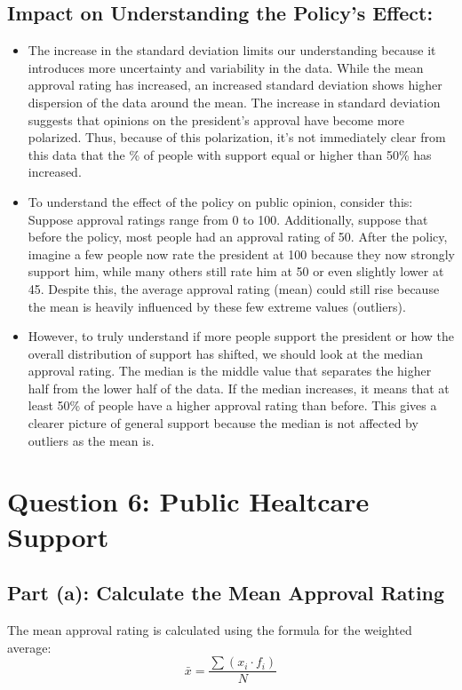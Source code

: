 \documentclass{article}
\begin{document}
\subsection*{Impact on Understanding the Policy's Effect:}
    \begin{itemize}
        \item The increase in the standard deviation limits our understanding because it introduces more uncertainty and variability in the data. While the mean approval rating has increased, an increased standard deviation shows higher dispersion of the data around the mean. The increase in standard deviation suggests that opinions on the president's approval have become more polarized. Thus, because of this polarization, it's not immediately clear from this data that the \% of people with support equal or higher than 50\% has increased.
        \item To understand the effect of the policy on public opinion, consider this: Suppose approval ratings range from 0 to 100. Additionally, suppose that before the policy, most people had an approval rating of 50. After the policy, imagine a few people now rate the president at 100 because they now strongly support him, while many others still rate him at 50 or even slightly lower at 45. Despite this, the average approval rating (mean) could still rise because the mean is heavily influenced by these few extreme values (outliers).
        \item However, to truly understand if more people support the president or how the overall distribution of support has shifted, we should look at the median approval rating. The median is the middle value that separates the higher half from the lower half of the data. If the median increases, it means that at least 50\% of people have a higher approval rating than before. This gives a clearer picture of general support because the median is not affected by outliers as the mean is.
    \end{itemize}

\section{Question 6: Public Healtcare Support}

\subsection*{Part (a): Calculate the Mean Approval Rating}
The mean approval rating is calculated using the formula for the weighted average:
\[
\bar{x} = \frac{\sum (x_i \cdot f_i)}{N}
\]
\end{document}
